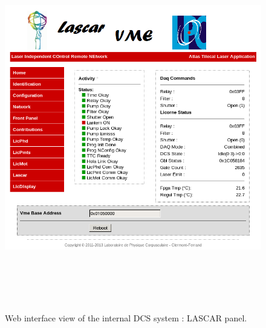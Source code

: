 \begin{appendices}
\begin{figure}[htbp]
\centering
\includegraphics[height=16cm]{figures/licorne_web4.png}
\caption{Web interface view of the internal DCS system :  LASCAR panel.}\label{fig:licorne_webb}
\end{figure}



\newpage


\end{appendices}
